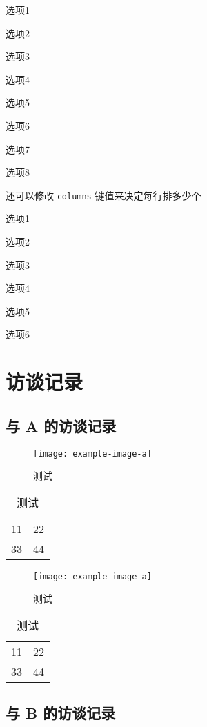 \begin{choices}[label = \circlednumber*]
  \item 选项1
  \item 选项2
  \item 选项3
  \item 选项4
  \item 选项5
  \item 选项6
  \item 选项7
  \item 选项8
\end{choices}


还可以修改 \verb|columns| 键值来决定每行排多少个
\begin{choices}[
  columns = 3,            %
  label = (\arabic*)      %
]
  \item 选项1
  \item 选项2
  \item 选项3
  \item 选项4
  \item 选项5
  \item 选项6
\end{choices}



\chapter{访谈记录}


\section{与 A 的访谈记录}

\begin{figure}[htbp]
  \centering
  \texttt{[image: example-image-a]}
  \caption{测试}
  \label{figure:test2}
\end{figure}

\begin{table}[htbp]
  \centering
  \caption{测试}
  \label{table:test2}
  \begin{tabular}{|c|c|}
    11 & 22 \\
    33 & 44 
  \end{tabular}
\end{table}

\begin{figure}[htbp]
  \centering
  \texttt{[image: example-image-a]}
  \caption{测试}
  \label{figure:test3}
\end{figure}

\begin{table}[htbp]
  \centering
  \caption{测试}
  \label{table:test3}
  \begin{tabular}{|c|c|}
    11 & 22 \\
    33 & 44 
  \end{tabular}
\end{table}

\section{与 B 的访谈记录}